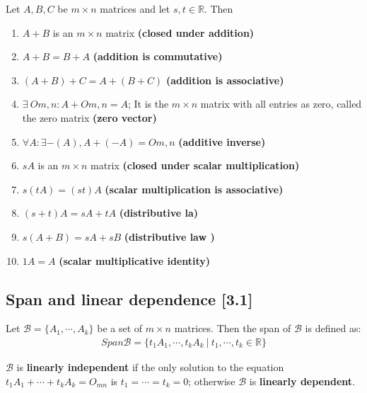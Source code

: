 \documentclass[a4paper,9pt]{extarticle}
\begin{document}
\begin{multicols*}{2}
\noindent Let $A, B, C$ be $m \times n$ matrices and let $s, t \in \mathbb{R}$. Then
\begin{enumerate}[label=\bfseries (\arabic*)] \itemsep0pt \parskip0pt 
    \item $A + B$ is an $m \times n$ matrix \textbf{(closed under addition)}
    \item $A + B = B + A$ \textbf{(addition is commutative)}
    \item $(A + B) + C = A + (B + C)$ \textbf{(addition is associative)}
    \item $\exists \ O{m,n}: A + O{m,n} = A$; It is the $m \times n$ matrix with all entries as zero, called the zero matrix \textbf{(zero vector)}
    \item $\forall A: \exists -(A), A + (-A) = O{m,n}$ \textbf{(additive inverse)}
    \item $sA$ is an $m \times n$ matrix \textbf{(closed under scalar multiplication)}
    \item $s(t A) = (st) A$ \textbf{(scalar multiplication is associative)}
    \item $(s + t) A = s A + t A$ \textbf{(distributive la)}
    \item $s(A + B) = s A + s B$ \textbf{(distributive law )}
    \item $1 A = A$ \textbf{(scalar multiplicative identity)}
\end{enumerate}


\subsection{Span and linear dependence [3.1]}
Let $\mathcal{B} = \{A_1, \cdots, A_k\}$ be a set of $m \times n$ matrices. Then the span of $\mathcal{B}$ is defined as:
\begin{equation} \label{3.1-2}
    \begin{split}
        Span \mathcal{B} = \{t_1 A_1, \cdots, t_k A_k \ | \ t_1, \cdots, t_k \in \mathbb{R} \}
    \end{split}
\end{equation}

$\mathcal{B}$ is \textbf{linearly independent} if the only solution to the equation $t_1 A_1 + \cdots + t_k A_k = O_{mn}$ is $t_1 = \cdots = t_k = 0$; otherwise $\mathcal{B}$ is \textbf{linearly dependent}.



\end{multicols*}
\end{document}
